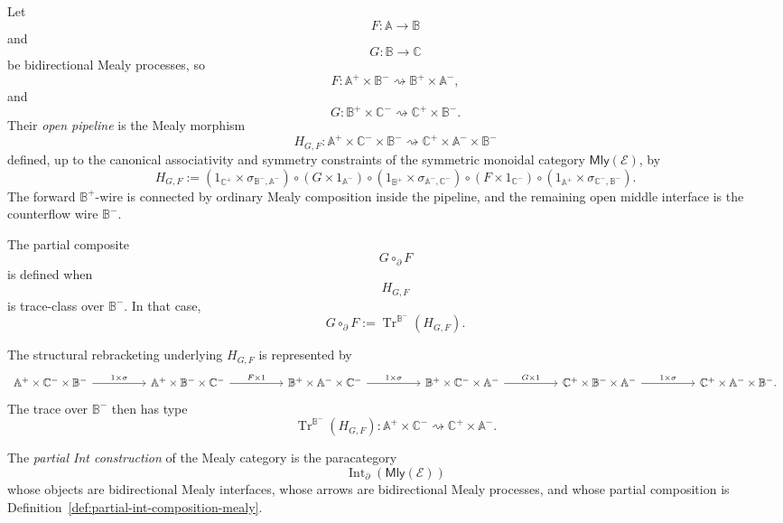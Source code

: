 \begin{definition}
\label{def:partial-int-composition-mealy}
Let
\[
F:\mathbb A\to\mathbb B
\]
and
\[
G:\mathbb B\to\mathbb C
\]
be bidirectional Mealy processes, so
\[
F:
\mathbb A^+\times\mathbb B^-
\rightsquigarrow
\mathbb B^+\times\mathbb A^-,
\]
and
\[
G:
\mathbb B^+\times\mathbb C^-
\rightsquigarrow
\mathbb C^+\times\mathbb B^-.
\]
Their \emph{open pipeline} is the Mealy morphism
\[
H_{G,F}:
\mathbb A^+\times\mathbb C^-\times\mathbb B^-
\rightsquigarrow
\mathbb C^+\times\mathbb A^-\times\mathbb B^-
\]
defined, up to the canonical associativity and symmetry constraints of the
symmetric monoidal category \(\mathsf{Mly}(\mathcal E)\), by
\[
H_{G,F}
:=
(1_{\mathbb C^+}\times\sigma_{\mathbb B^-,\mathbb A^-})
\circ
(G\times 1_{\mathbb A^-})
\circ
(1_{\mathbb B^+}\times\sigma_{\mathbb A^-,\mathbb C^-})
\circ
(F\times 1_{\mathbb C^-})
\circ
(1_{\mathbb A^+}\times\sigma_{\mathbb C^-,\mathbb B^-}).
\]
The forward \(\mathbb B^+\)-wire is connected by ordinary Mealy composition
inside the pipeline, and the remaining open middle interface is the
counterflow wire \(\mathbb B^-\).

The partial composite
\[
G\circ_{\partial}F
\]
is defined when
\[
H_{G,F}
\]
is trace-class over \(\mathbb B^-\).  In that case,
\[
G\circ_{\partial}F
:=
\operatorname{Tr}^{\mathbb B^-}(H_{G,F}).
\]
\end{definition}

The structural rebracketing underlying \(H_{G,F}\) is represented by
\[
\begin{tikzcd}[column sep=huge,row sep=large]
\mathbb A^+\times\mathbb C^-\times\mathbb B^-
  \arrow[r, "{1\times\sigma}"]
&
\mathbb A^+\times\mathbb B^-\times\mathbb C^-
  \arrow[r, "{F\times 1}"]
&
\mathbb B^+\times\mathbb A^-\times\mathbb C^-
  \arrow[r, "{1\times\sigma}"]
&
\mathbb B^+\times\mathbb C^-\times\mathbb A^-
  \arrow[r, "{G\times 1}"]
&
\mathbb C^+\times\mathbb B^-\times\mathbb A^-
  \arrow[r, "{1\times\sigma}"]
&
\mathbb C^+\times\mathbb A^-\times\mathbb B^- .
\end{tikzcd}
\]
The trace over \(\mathbb B^-\) then has type
\[
\operatorname{Tr}^{\mathbb B^-}(H_{G,F}):
\mathbb A^+\times\mathbb C^-
\rightsquigarrow
\mathbb C^+\times\mathbb A^-.
\]

\begin{definition}
\label{def:partial-int-paracategory-mealy}
The \emph{partial Int construction} of the Mealy category is the paracategory
\[
\operatorname{Int}_{\partial}(\mathsf{Mly}(\mathcal E))
\]
whose objects are bidirectional Mealy interfaces, whose arrows are
bidirectional Mealy processes, and whose partial composition is
Definition~\ref{def:partial-int-composition-mealy}.
\end{definition}

